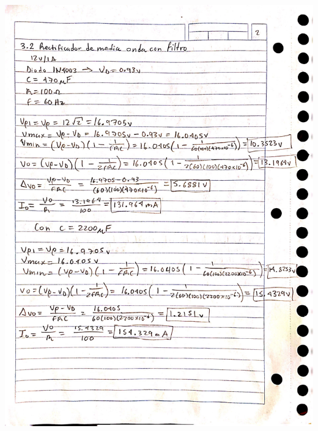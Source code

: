 \documentclass[12pt]{article}
\begin{document}
\begin{itemize}
\begin{center}
            \includegraphics*[scale=0.2]{an2.jpg}

\end{center}
\end{itemize}
\end{document}

